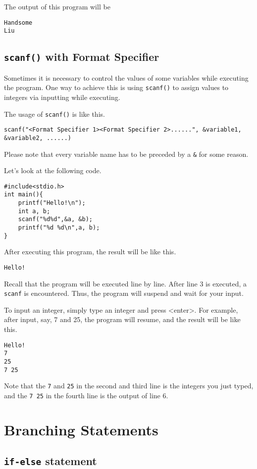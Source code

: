 \documentclass{report}
\begin{document}
The output of this program will be
\begin{lstlisting}[style=CLstyle]
Handsome
Liu
\end{lstlisting}

    \subsection{\texttt{scanf()} with Format Specifier}
    Sometimes it is necessary to control the values of some variables while executing the program. One way to achieve this is using \texttt{scanf()} to assign values to integers via inputting while executing.

    The usage of \texttt{scanf()} is like this.\begin{center}\texttt{scanf("<Format Specifier 1><Format Specifier 2>......", \&variable1, \&variable2, ......)}\end{center}
    Please note that every variable name has to be preceded by a \texttt{\&} for some reason.

    Let's look at the following code.

\begin{lstlisting}[style=CStyle]
#include<stdio.h>
int main(){
    printf("Hello!\n");
    int a, b;
    scanf("%d%d",&a, &b);
    printf("%d %d\n",a, b);
}
\end{lstlisting}
After executing this program, the result will be like this.
\begin{lstlisting}[style=CLstyle]
Hello!

\end{lstlisting}
Recall that the program will be executed line by line. After line 3 is executed, a \texttt{scanf} is encountered. Thus, the program will suspend and wait for your input.

To input an integer, simply type an integer and press <enter>. For example, after input, say, 7 and 25, the program will resume, and the result will be like this.

\begin{lstlisting}[style=CLstyle]
Hello!
7
25
7 25
\end{lstlisting}
Note that the \texttt{7} and \texttt{25} in the second and third line is the integers you just typed, and the \texttt{7 25} in the fourth line is the output of line 6.
\section{Branching Statements}
\subsection{\texttt{if-else} statement}
\end{document}
